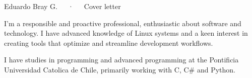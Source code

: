 \documentclass[12pt, a4paper]{awesome-cv}
\begin{document}
\makecvheader[R]

\makecvfooter
{}
{Eduardo Bray G.~~~·~~~Cover letter}
{}

\makelettertitle

\begin{cvletter}

	I'm a responsible and proactive professional, enthusiastic about software
	and technology. I have advanced knowledge of Linux systems and a keen
	interest in creating tools that optimize and streamline development
	workflows.

	I have studies in programming and advanced programming at the Pontificia
	Universidad Catolica de Chile, primarily working with C, C\# and Python.

\end{cvletter}


\end{document}
